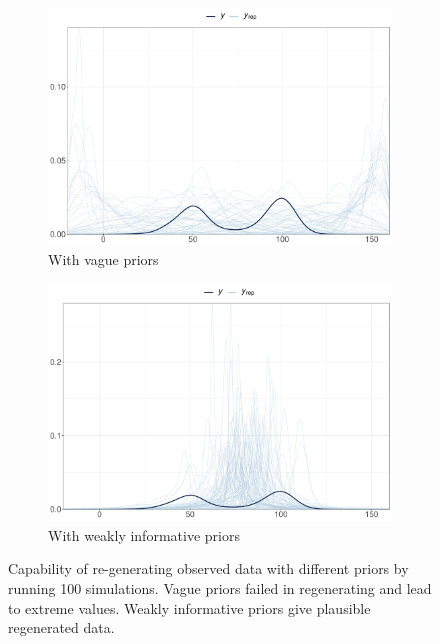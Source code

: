 \documentclass[a4paper]{article}   	%
\begin{document}
	
	\begin{figure}[!htp]
		\centering
		\begin{subfigure}[t]{0.45\textwidth}
			\centering
			\includegraphics[width=\linewidth]{Images/priorcheck_vague}
			\caption{With vague priors}
		\end{subfigure}
		\space
		\begin{subfigure}[t]{0.45\textwidth}
			\centering
			\includegraphics[width=\linewidth]{Images/priorcheck_weak}
			\caption{With weakly informative priors}
		\end{subfigure}
		\caption{Capability of re-generating observed data with different priors by running 100 simulations. Vague priors failed in regenerating and lead to extreme values. Weakly informative priors give plausible regenerated data. }\label{fig:priorcheck}
	\end{figure}
	
\end{document}
